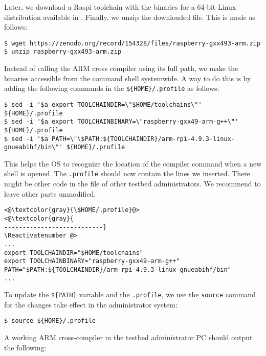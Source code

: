 Later, we download a \ac{Raspi} toolchain with the binaries for a 64-bit Linux
distribution available in \cite{soerensen_chres_wiant_2016_154143}. Finally, we unzip the
downloaded file. This is made as follows:

\begin{lstlisting}[]
$ wget https://zenodo.org/record/154328/files/raspberry-gxx493-arm.zip
$ unzip raspberry-gxx493-arm.zip
\end{lstlisting}
\FloatBarrier
\vspace{-5mm}

Instead of calling the ARM cross compiler using its full path, we make
the binaries accessible from the command shell systemwide. A way to do
this is by adding the following commands in the \texttt{\$\{HOME\}/.profile}
as follows:

\begin{lstlisting}[]
$ sed -i '$a export TOOLCHAINDIR=\"$HOME/toolchains\"' ${HOME}/.profile
$ sed -i '$a export TOOLCHAINBINARY=\"raspberry-gxx49-arm-g++\"' ${HOME}/.profile
$ sed -i '$a PATH=\"\$PATH:${TOOLCHAINDIR}/arm-rpi-4.9.3-linux-gnueabihf/bin\"' ${HOME}/.profile
\end{lstlisting}
\FloatBarrier
\vspace{-5mm}

This helps the \ac{OS} to recognize the location of the compiler
command when a new shell is opened. The \texttt{.profile} should now
contain the lines we inserted. There might be other
code in the file of other testbed administrators. We recommend to leave
other parts unmodified.
\Suppressnumber\begin{lstlisting}[]
<@\textcolor{gray}{\$HOME/.profile}@>
<@\textcolor{gray}{
---------------------------}
\Reactivatenumber @>
...
export TOOLCHAINDIR="$HOME/toolchains"
export TOOLCHAINBINARY="raspberry-gxx49-arm-g++"
PATH="$PATH:${TOOLCHAINDIR}/arm-rpi-4.9.3-linux-gnueabihf/bin"
...
\end{lstlisting}
\FloatBarrier
\vspace{-5mm}

To update the \texttt{\$\{PATH\}} variable and the \texttt{.profile}, we
use the \texttt{source} command for the changes take effect in the
administrator system:
\begin{lstlisting}[]
$ source ${HOME}/.profile
\end{lstlisting}
\FloatBarrier
\vspace{-5mm}

A working ARM cross-compiler in the testbed administrator \ac{PC} should
output the following:

